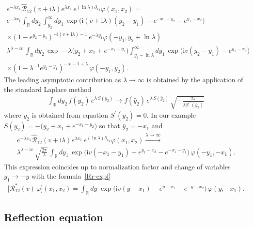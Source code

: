 \documentclass[11pt]{article}
\numberwithin{equation}{section}
\theoremstyle{plain}
\theoremstyle{definition}
\renewcommand{\phi}{\varphi}
\renewcommand{\imath}{\mathrm{i}}
\begin{document}
\begin{multline*}
	e^{-\lambda x_1}\widehat{\mathcal{R}}_{12}(v+\imath\lambda)e^{\lambda x_1} \, 
	e^{(\ln\lambda)\partial_{x_2}}\phi (x_1, x_2) = \\
	e^{-\lambda x_1}
	\int_\mathbb{R} dy_2 \, \int_{y_2}^\infty dy_1 \, \exp \bigl( \imath (v+\imath\lambda) (y_2 - y_1) - e^{-x_1 - y_2} - e^{y_1- x_2 } \bigr) \\[6pt]
	\times (1 - e^{y_2 - y_1})^{-\imath(v+\imath\lambda) - 1} \, 
	e^{-\lambda y_1}\phi(-y_1, y_2+\ln\lambda) = \\ 
	\lambda^{\lambda-iv}\,
	\int_\mathbb{R} dy_2 \, \exp -\lambda\bigl(y_2+x_1+ e^{-x_1 - y_2}\bigl)   
	\int_{y_2-\ln\lambda}^\infty dy_1 \, \exp \bigl( \imath v (y_2 - y_1)  - e^{y_1- x_2 } \bigr) \\[6pt]
	\times (1 - \lambda^{-1}e^{y_2 - y_1})^{-\imath v- 1 +\lambda} \, \phi(-y_1, y_2).
\end{multline*}
The leading asymptotic contribution as $\lambda \to \infty$ is obtained by
the application of the standard Laplace method
\begin{align*}
	\int_\mathbb{R} dy_2\, f(y_2)\,e^{\lambda\,S(y_2)} \to
	f(\bar{y}_2)\,e^{\lambda\,S(\bar{y}_2)}\,\sqrt{-\frac{2\pi}{\lambda S^{\prime\prime}(\bar{y}_2)}}
\end{align*}
where $\bar{y}_2$ is obtained from equation $S^{\prime}(\bar{y}_2) = 0$.
In our example
$S(y_2) = -\bigl(y_2+x_1+ e^{-x_1 - y_2}\bigl)$ so that $\bar{y}_2 = -x_1$ and 
\begin{multline*}
	e^{-\lambda x_1}\widehat{\mathcal{R}}_{12}(v+\imath\lambda)e^{\lambda x_1} \, 
	e^{(\ln\lambda)\partial_{x_2}}\phi (x_1, x_2) \xrightarrow{\lambda \to \infty} \\ 
	\lambda^{\lambda-\imath v}\,\sqrt{\frac{2\pi}{\lambda}}\,   
	\int_{\mathbb{R}} dy_1 \, \exp \bigl( \imath v (-x_1 - y_1)  - e^{y_1- x_2 } -e^{-x_1 - y_1}\bigr)\, \phi(-y_1, -x_1).
\end{multline*}
This expression coincides up to normalization factor and change 
of variables $y_1 \to -y$ with the formula~\eqref{Rr-expl} 
\begin{align*}
	\bigl[ \mathcal{R}^*_{12} (v)\, \phi \bigr](x_1, x_2) = \int_{\mathbb{R}} dy \; \exp \bigl( \imath v(y - x_1) - e^{y - x_1} - e^{-y - x_2} \bigr)\, \phi(y, -x_1).
\end{align*}



\subsection{Reflection equation} \label{sect:ReflEq}
\end{document}

